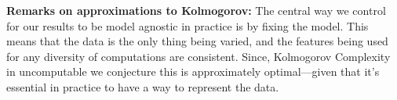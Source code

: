 \documentclass[10pt]{article} %
\begin{document}
\textbf{Remarks on approximations to Kolmogorov: }
The central way we control for our results to be model agnostic in practice is by fixing the model. 
This means that the data is the only thing being varied, and the features being used for any diversity of computations are consistent. 
Since, Kolmogorov Complexity in uncomputable we conjecture this is approximately optimal---given that it's essential in practice to have a way to represent the data. 

\end{document}
